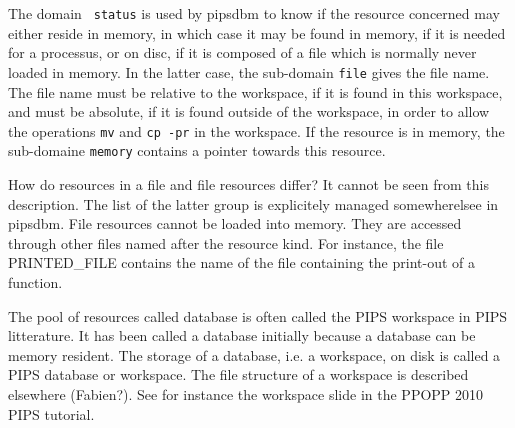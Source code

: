 \documentclass[a4paper]{article}
\begin{document}
{ The domain {\tt
    status} is used by pipsdbm to know if the resource concerned may
  either reside in memory, in which case it may be found in
  memory, if it is needed for a processus, or on disc, if it is
  composed of a file which is normally never loaded in memory. In the
  latter case, the sub-domain {\tt file} gives the file
  name.  The file name must be relative to the workspace, if it is
  found in this workspace, and must be absolute, if it is found
  outside of the workspace, in order to allow the operations
  \texttt{mv} and \texttt{cp -pr} in the workspace.  If the
  resource is in memory, the sub-domaine {\tt memory} contains a
  pointer towards this resource.
 
How do resources in a file and file resources differ? It cannot be seen
from this description. The list of the latter group is explicitely managed
somewherelsee in pipsdbm. File resources cannot be loaded into
memory. They are accessed through other files named after the resource
kind. For instance, the file PRINTED\_FILE contains the name of the
file containing the print-out of a function.

The pool of resources called database is often called the PIPS
workspace in PIPS litterature. It has been called a database initially
because a database can be memory resident.  The storage of a database,
i.e. a workspace, on disk is called a PIPS database or workspace. The
file structure of a workspace is described elsewhere (Fabien?). See
for instance the workspace slide in the PPOPP 2010 PIPS tutorial.  }
 
\end{document}
